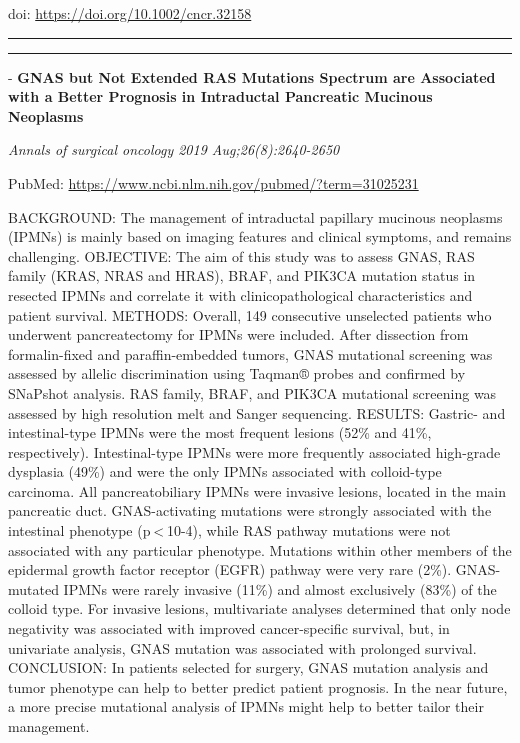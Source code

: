 \documentclass[]{article}
\begin{document}
doi: \url{https://doi.org/10.1002/cncr.32158}

{}

{}

\begin{center}\rule{0.5\linewidth}{\linethickness}\end{center}

\begin{center}\rule{0.5\linewidth}{\linethickness}\end{center}

 - \textbf{GNAS but Not Extended RAS Mutations Spectrum are Associated
with a Better Prognosis in Intraductal Pancreatic Mucinous Neoplasms}

\emph{Annals of surgical oncology 2019 Aug;26(8):2640-2650}

PubMed: \url{https://www.ncbi.nlm.nih.gov/pubmed/?term=31025231}

BACKGROUND: The management of intraductal papillary mucinous neoplasms
(IPMNs) is mainly based on imaging features and clinical symptoms, and
remains challenging. OBJECTIVE: The aim of this study was to assess
GNAS, RAS family (KRAS, NRAS and HRAS), BRAF, and PIK3CA mutation status
in resected IPMNs and correlate it with clinicopathological
characteristics and patient survival. METHODS: Overall, 149 consecutive
unselected patients who underwent pancreatectomy for IPMNs were
included. After dissection from formalin-fixed and paraffin-embedded
tumors, GNAS mutational screening was assessed by allelic discrimination
using Taqman® probes and confirmed by SNaPshot analysis. RAS family,
BRAF, and PIK3CA mutational screening was assessed by high resolution
melt and Sanger sequencing. RESULTS: Gastric- and intestinal-type IPMNs
were the most frequent lesions (52\% and 41\%, respectively).
Intestinal-type IPMNs were more frequently associated high-grade
dysplasia (49\%) and were the only IPMNs associated with colloid-type
carcinoma. All pancreatobiliary IPMNs were invasive lesions, located in
the main pancreatic duct. GNAS-activating mutations were strongly
associated with the intestinal phenotype (p \textless{} 10-4), while RAS
pathway mutations were not associated with any particular phenotype.
Mutations within other members of the epidermal growth factor receptor
(EGFR) pathway were very rare (2\%). GNAS-mutated IPMNs were rarely
invasive (11\%) and almost exclusively (83\%) of the colloid type. For
invasive lesions, multivariate analyses determined that only node
negativity was associated with improved cancer-specific survival, but,
in univariate analysis, GNAS mutation was associated with prolonged
survival. CONCLUSION: In patients selected for surgery, GNAS mutation
analysis and tumor phenotype can help to better predict patient
prognosis. In the near future, a more precise mutational analysis of
IPMNs might help to better tailor their management.
\end{document}
